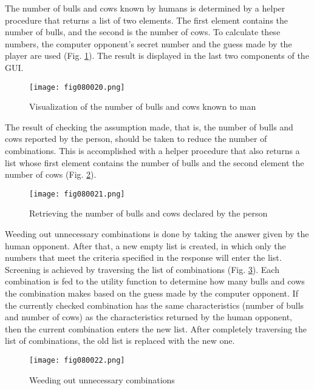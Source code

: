 The number of bulls and cows known by humans is determined by a helper procedure that returns a list of two elements. The first element contains the number of bulls, and the second is the number of cows. To calculate these numbers, the computer opponent's secret number and the guess made by the player are used (Fig. \ref{fig080020}). The result is displayed in the last two components of the GUI.

\begin{figure}[H]
   \centering
   \texttt{[image: fig080020.png]}
   \caption{Visualization of the number of bulls and cows known to man}
\label{fig080020}
\end{figure}

The result of checking the assumption made, that is, the number of bulls and cows reported by the person, should be taken to reduce the number of combinations. This is accomplished with a helper procedure that also returns a list whose first element contains the number of bulls and the second element the number of cows (Fig. \ref{fig080021}).

\begin{figure}[H]
   \centering
   \texttt{[image: fig080021.png]}
   \caption{Retrieving the number of bulls and cows declared by the person}
\label{fig080021}
\end{figure}

Weeding out unnecessary combinations is done by taking the answer given by the human opponent. After that, a new empty list is created, in which only the numbers that meet the criteria specified in the response will enter the list. Screening is achieved by traversing the list of combinations (Fig. \ref{fig080022}). Each combination is fed to the utility function to determine how many bulls and cows the combination makes based on the guess made by the computer opponent. If the currently checked combination has the same characteristics (number of bulls and number of cows) as the characteristics returned by the human opponent, then the current combination enters the new list. After completely traversing the list of combinations, the old list is replaced with the new one.

\begin{figure}[H]
   \centering
   \texttt{[image: fig080022.png]}
   \caption{Weeding out unnecessary combinations}
\label{fig080022}
\end{figure}

